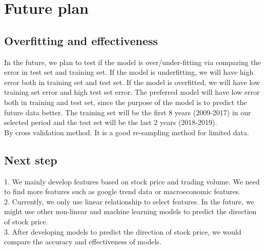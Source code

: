 \documentclass{article}
\begin{document}
\section{Future plan}
\subsection{Overfitting and effectiveness}
In the future, we plan to test if the model is over/under-fitting via comparing the error in test set and training set. If the model is underfitting, we will have high error both in training set and test set. If the model is overfitted, we will have low training set error and high test set error. The preferred model will have low error both in training and test set, since the purpose of the model is to predict the future data better. The training set will be the first 8 years (2009-2017) in our selected period and the test set will be the last 2 years (2018-2019).\\
By cross validation method. It is a good re-sampling method for limited data.
\subsection{Next step}
1. We mainly develop features based on stock price and trading volume. We need to find more features such as google trend data or macroeconomic features.\\
2. Currently, we only use linear relationship to select features. In the future, we might use other non-linear and machine learning models to predict the direction of stock price.\\
3. After developing models to predict the direction of stock price, we would compare the accuracy and effectiveness of models. 
\end{document}
